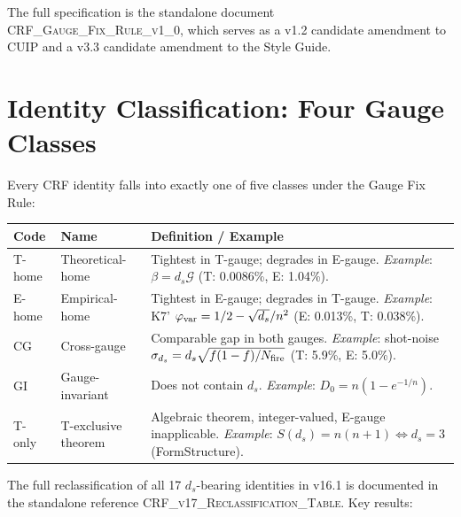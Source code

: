 \documentclass[12pt, a4paper]{article}
\begin{document}
The full specification is the standalone document
\textsc{CRF\_Gauge\_Fix\_Rule\_v1\_0}, which serves as a v1.2 candidate
amendment to CUIP and a v3.3 candidate amendment to the Style Guide.

\section{Identity Classification: Four Gauge Classes}

Every CRF identity falls into exactly one of five classes under the Gauge
Fix Rule:

\begin{center}
{\small
\renewcommand{\arraystretch}{1.30}
\begin{tabular}{p{1.7cm} p{3cm} p{8cm}}
\toprule
\textbf{Code} & \textbf{Name} & \textbf{Definition / Example} \\
\midrule
T-home & Theoretical-home &
  Tightest in T-gauge; degrades in E-gauge. \emph{Example}: $\beta = d_s\mathcal{G}$
  (T: 0.0086\%, E: 1.04\%). \\
E-home & Empirical-home &
  Tightest in E-gauge; degrades in T-gauge. \emph{Example}: K7'
  $\varphi_{\rm var} = 1/2 - \sqrt{d_s}/n^2$ (E: 0.013\%, T: 0.038\%). \\
CG & Cross-gauge &
  Comparable gap in both gauges. \emph{Example}: shot-noise
  $\sigma_{d_s} = d_s\sqrt{f(1-f)/N_{\rm fire}}$ (T: 5.9\%, E: 5.0\%). \\
GI & Gauge-invariant &
  Does not contain $d_s$. \emph{Example}: $D_0 = n(1 - e^{-1/n})$. \\
T-only & T-exclusive theorem &
  Algebraic theorem, integer-valued, E-gauge inapplicable.
  \emph{Example}: $S(d_s) = n(n+1) \iff d_s = 3$ (FormStructure). \\
\bottomrule
\end{tabular}
}
\end{center}

The full reclassification of all 17 $d_s$-bearing identities in v16.1 is
documented in the standalone reference
\textsc{CRF\_v17\_Reclassification\_Table}. Key results:
\end{document}

